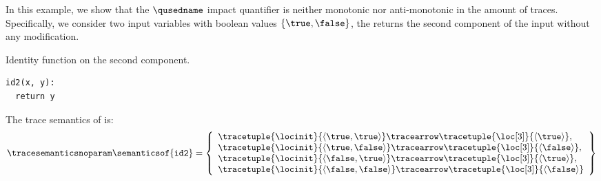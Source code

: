 \begin{example}
In this example, we show that the $\qusedname$ impact quantifier is neither monotonic nor anti-monotonic in the amount of traces.
Specifically, we consider two input variables with boolean values $\{\true, \false\}$, the  returns the second component of the input without any modification.
\begin{marginlisting}[*-2]
  \caption{Identity function on the second component.}
  \vspace{25pt}
\begin{lstlisting}[style=mystyle,language=customPython]
id2(x, y):
  return y
 \end{lstlisting}
\end{marginlisting}
The trace semantics of  is:
\begin{align*}
  \tracesemanticsnoparam\semanticsof{\texttt{id2}}
  =
  \left\{
    \begin{array}{l}
      \tracetuple{\locinit}{\langle \true, \true\rangle}\tracearrow\tracetuple{\loc[3]}{\langle \true\rangle}, \\
      \tracetuple{\locinit}{\langle \true, \false\rangle}\tracearrow\tracetuple{\loc[3]}{\langle \false\rangle}, \\
      \tracetuple{\locinit}{\langle \false, \true\rangle}\tracearrow\tracetuple{\loc[3]}{\langle \true\rangle}, \\
      \tracetuple{\locinit}{\langle \false, \false\rangle}\tracearrow\tracetuple{\loc[3]}{\langle \false\rangle}
    \end{array}
    \right\}
\end{align*}
\begin{marginfigure}[*-4]
\end{marginfigure}
\end{example}
